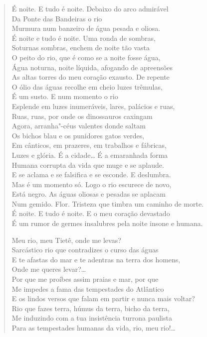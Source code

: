 \begin{verse}
É noite. E tudo é noite. Debaixo do arco admirável\\
Da Ponte das Bandeiras o rio\\
Murmura num banzeiro de água pesada e oliosa.\\
É noite e tudo é noite. Uma ronda de sombras,\\
Soturnas sombras, enchem de noite tão vasta\\
O peito do rio, que é como se a noite fosse água,\\
Água noturna, noite líquida, afogando de apreensões\\
As altas torres do meu coração exausto. De repente\\
O ólio das águas recolhe em cheio luzes trêmulas,\\
É um susto. E num momento o rio\\
Esplende em luzes inumeráveis, lares, palácios e ruas,\\
Ruas, ruas, por onde os dinossauros caxingam\\
Agora, arranha"-céus valentes donde saltam\\
Os bichos blau e os punidores gatos verdes,\\
Em cânticos, em prazeres, em trabalhos e fábricas,\\
Luzes e glória. É a cidade\ldots{} É a emaranhada forma\\
Humana corrupta da vida que muge e se aplaude.\\
E se aclama e se falsifica e se esconde. E deslumbra.\\
Mas é um momento só. Logo o rio escurece de novo,\\
Está negro. As águas oliosas e pesadas se aplacam\\
Num gemido. Flor. Tristeza que timbra um caminho de morte.\\
É noite. E tudo é noite. E o meu coração devastado\\
É um rumor de germes insalubres pela noite insone e humana.

Meu rio, meu Tietê, onde me levas?\\
Sarcástico rio que contradizes o curso das águas\\
E te afastas do mar e te adentras na terra dos homens,\\
Onde me queres levar?\ldots{}\\
Por que me proíbes assim praias e mar, por que\\
Me impedes a fama das tempestades do Atlântico\\
E os lindos versos que falam em partir e nunca mais voltar?\\
Rio que fazes terra, húmus da terra, bicho da terra,\\
Me induzindo com a tua insistência turrona paulista\\
Para as tempestades humanas da vida, rio, meu rio!\ldots{}


\end{verse}
